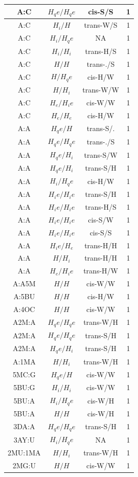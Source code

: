 \begin{center}
\begin{longtable}{c|c|c|c}
A:C & $H_qe/H_qe$ & cis-S/S & 1 \\  \hline
A:C & $H_i/H$ & trans-W/S & 1 \\  \hline
A:C & $H_i/H_qe$ & NA & 1 \\  \hline
A:C & $H_i/H_i$ & trans-H/S & 1 \\  \hline
A:C & $H/H$ & trans-./S & 1 \\  \hline
A:C & $H/H_qe$ & cis-H/W & 1 \\  \hline
A:C & $H/H_i$ & trans-W/W & 1 \\  \hline
A:C & $H_e/H_ie$ & cis-W/W & 1 \\  \hline
A:C & $H_e/H_e$ & cis-H/W & 1 \\  \hline
A:A & $H_qe/H$ & trans-S/. & 1 \\  \hline
A:A & $H_qe/H_qe$ & trans-./S & 1 \\  \hline
A:A & $H_qe/H_i$ & trans-S/W & 1 \\  \hline
A:A & $H_qe/H_i$ & trans-S/H & 1 \\  \hline
A:A & $H_i/H_qe$ & cis-H/W & 1 \\  \hline
A:A & $H_ie/H_ie$ & trans-S/H & 1 \\  \hline
A:A & $H_ie/H_ie$ & trans-H/S & 1 \\  \hline
A:A & $H_ie/H_ie$ & cis-S/W & 1 \\  \hline
A:A & $H_ie/H_ie$ & cis-S/S & 1 \\  \hline
A:A & $H_ie/H_e$ & trans-H/H & 1 \\  \hline
A:A & $H/H_i$ & trans-H/H & 1 \\  \hline
A:A & $H_e/H_ie$ & trans-H/W & 1 \\  \hline
A:A5M & $H/H$ & cis-W/W & 1 \\  \hline
A:5BU & $H/H$ & cis-H/W & 1 \\  \hline
A:4OC & $H/H$ & cis-W/W & 1 \\  \hline
A2M:A & $H_qe/H_qe$ & trans-W/H & 1 \\  \hline
A2M:A & $H_qe/H_qe$ & trans-S/H & 1 \\  \hline
A2M:A & $H_qe/H_i$ & trans-S/H & 1 \\  \hline
A:1MA & $H/H_i$ & trans-W/H & 1 \\  \hline
5MC:G & $H_qe/H$ & cis-W/W & 1 \\  \hline
5BU:G & $H_i/H_i$ & cis-W/W & 1 \\  \hline
5BU:A & $H_i/H_qe$ & cis-W/H & 1 \\  \hline
5BU:A & $H/H$ & cis-W/H & 1 \\  \hline
3DA:A & $H_qe/H_qe$ & trans-S/H & 1 \\  \hline
3AY:U & $H_i/H_qe$ & NA & 1 \\  \hline
2MU:1MA & $H/H_i$ & trans-W/H & 1 \\  \hline
2MG:U & $H/H$ & cis-W/W & 1 \\  \hline
\end{longtable}
\end{center}





